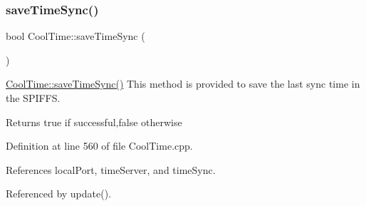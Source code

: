 \subsubsection{\texorpdfstring{save\+Time\+Sync()}{saveTimeSync()}}
{\footnotesize\ttfamily bool Cool\+Time\+::save\+Time\+Sync (\begin{DoxyParamCaption}{ }\end{DoxyParamCaption})}

\hyperlink{classCoolTime_ae9658c9b377510d469e3b88edf33ee85}{Cool\+Time\+::save\+Time\+Sync()} This method is provided to save the last sync time in the S\+P\+I\+F\+FS.

\begin{DoxyReturn}{Returns}
true if successful,false otherwise 
\end{DoxyReturn}


Definition at line 560 of file Cool\+Time.\+cpp.



References local\+Port, time\+Server, and time\+Sync.



Referenced by update().


